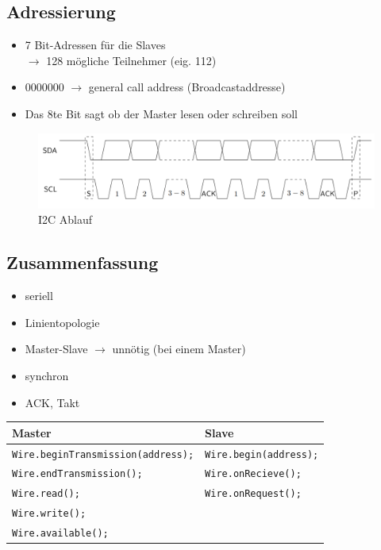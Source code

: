 \subsection*{Adressierung}
\begin{itemize}
	\item 7 Bit-Adressen für die Slaves \\
	$\rightarrow$ 128 mögliche Teilnehmer (eig. 112)
	\item 0000000 $\rightarrow$ general call address (Broadcastaddresse)
	\item Das 8te Bit sagt ob der Master lesen oder schreiben soll
\end{itemize}

\begin{figure}[H]
	\centering
	\includegraphics[width=0.8\linewidth]{figures/i2cablauf.png}
	\caption{I2C Ablauf}
\end{figure}

\subsection*{Zusammenfassung}
\begin{itemize}
	\item seriell
	\item Linientopologie
	\item Master-Slave $\rightarrow$ unnötig (bei einem Master)
	\item synchron
	\item ACK, Takt
\end{itemize}

\begin{tabular}{ | p{} | p{} |} \hline
	\textbf{Master} & \textbf{Slave} \\ \hline
	\texttt{Wire.beginTransmission(address);} & \texttt{Wire.begin(address);} \\
	\texttt{Wire.endTransmission();} & \texttt{Wire.onRecieve();} \\
	\texttt{Wire.read();} & \texttt{Wire.onRequest();} \\
	\texttt{Wire.write();} &  \\
	\texttt{Wire.available();} &  \\
	\hline
\end{tabular} 


